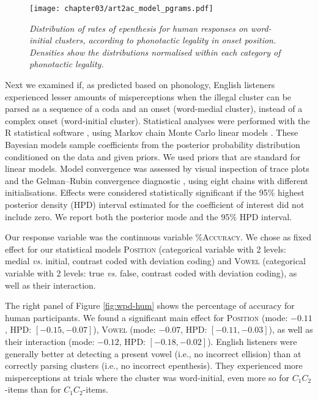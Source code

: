 {\begin{figure}[htb!]
  \centering
    \texttt{[image: chapter03/art2ac\_model\_pgrams.pdf]}    \caption{\textit{Distribution of rates of epenthesis for human responses on word-initial clusters, according to phonotactic legality in onset position. Densities show the distributions normalised within each category of phonotactic legality.}}
    \label{fig:wpd-legal}
  \end{figure}

  Next we examined if, as predicted based on phonology, English listeners experienced lesser amounts of misperceptions when the illegal cluster can be parsed as a sequence of a coda and an onset (word-medial cluster), instead of a complex onset (word-initial cluster). 
Statistical analyses were performed with the R statistical software \cite{R-base}, using Markov chain Monte Carlo linear models \cite{R-MCMCglmm, R-coda}. These Bayesian models sample coefficients from the posterior probability distribution conditioned on the data and given priors. We used priors that are standard for linear models. Model convergence was assessed by visual inspection of trace plots and the Gelman–Rubin convergence diagnostic \cite{gelman1992}, using eight chains with different initialisations. Effects were considered statistically significant if the 95\% highest posterior density (HPD) interval estimated for the coefficient of interest did not include zero. We report both the posterior mode and the 95\% HPD interval.  

Our response variable was the continuous variable \textsc{\%Accuracy}.
We chose as fixed effect for our statistical models \textsc{Position} (categorical variable with 2 levels: medial \textit{vs.} initial, contrast coded with deviation coding) and \textsc{Vowel} (categorical variable with 2 levels: true \textit{vs.} false, contrast coded with deviation coding), as well as their interaction.

The right panel of Figure \ref{fig:wpd-hum} shows the percentage of accuracy for human participants. We found a significant main effect for \textsc{Position} (mode: $-0.11$, HPD: $[-0.15, -0.07]$), \textsc{Vowel} (mode: $-0.07$, HPD: $[-0.11, -0.03]$), as well as their interaction (mode: $-0.12$, HPD: $[-0.18, -0.02]$). English listeners were generally better at detecting a present vowel (i.e., no incorrect ellision) than at correctly parsing clusters (i.e., no incorrect epenthesis). They experienced more misperceptions at trials where the cluster was word-initial, even more so for $C_{1}C_{2}$-items than for $C_{1}$\textipa{[@]}$C_{2}$-items. %

}
